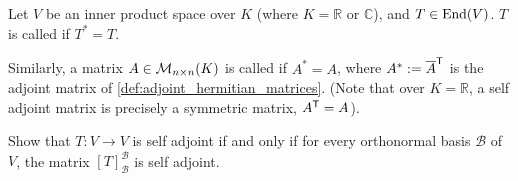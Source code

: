 \begin{definition}
\label{def:self_adjoint}
Let $V$ be an inner product space over $K$ (where $K = \mathbb{R}$ or $\mathbb{C}$), and $T \in \operatorname{End}(V)$. $T$ is called  if $T^* = T$. 

Similarly, a matrix $A \in \mathcal{M}_{n \times n}(K)$ is called  if $A^* = A$, where $A^* := \overline{A}^{\mathsf{T}}$ is the adjoint matrix of \cref{def:adjoint_hermitian_matrices}. (Note that over $K = \mathbb{R}$, a self adjoint matrix is precisely a symmetric matrix, $A^{\mathsf{T}} = A$).
\end{definition}

\begin{exercise}
\label{exc:self_adjoint_matrix_criterion}
Show that $T \colon V \to V$ is self adjoint if and only if for every orthonormal basis $\mathcal{B}$ of $V$, the matrix $[T]_{\mathcal{B}}^{\mathcal{B}}$ is self adjoint.
\end{exercise}

